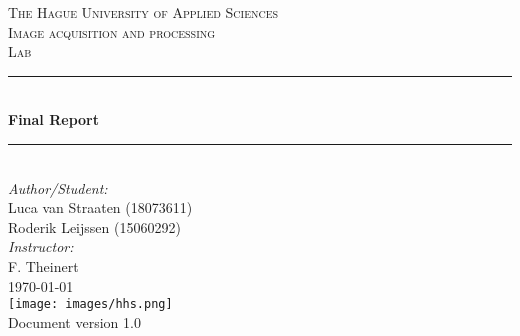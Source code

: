 \documentclass[a4paper]{article}
\begin{document}
\begin{titlepage}

\newcommand{\HRule}{\rule{\linewidth}{0.5mm}} 							%
\center 
 
\textsc{\LARGE The Hague University of Applied Sciences}\\[1cm]

\textsc{\Large Image acquisition and processing}\\[0.2cm]
\textsc{\large Lab}\\[1cm] 										%
\HRule \\[0.8cm]
{ \huge \bfseries Final Report}\\[0.7cm]								%
\HRule \\[2cm]
\large
\emph{Author/Student:}\\
Luca van Straaten (18073611)\\													%
Roderik Leijssen (15060292)\\[1.5cm]
\emph{Instructor:}\\
F.  Theinert\\[1.5cm]										
{\large \today}\\[5cm]
\texttt{[image: images/hhs.png]}\\[1cm] 	%
\vfill
Document version 1.0
\end{titlepage}


\newpage
  \tableofcontents
\newpage
{}


\graphicspath{ {./images/} }
\renewcommand{\thesubsection}{\thesection.\alph{subsection}}

\setcounter{section}{-1}








\end{document}
